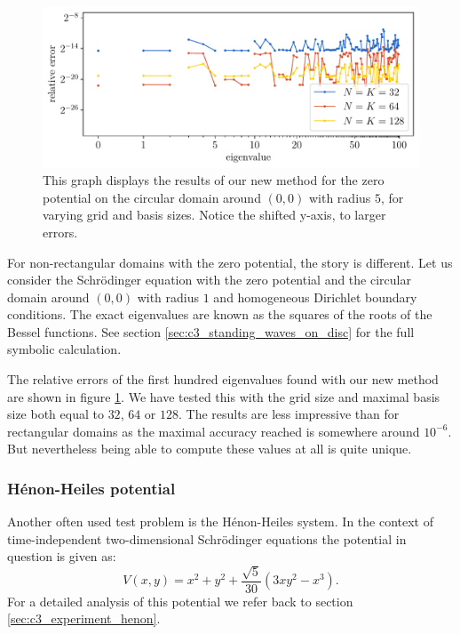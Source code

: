 \begin{figure}
    \begin{center}
        \includegraphics[width=\textwidth]{img/chapter4/nm_test_zero_disc.pdf}
    \end{center}
    \caption{This graph displays the results of our new method for the zero potential on the circular domain around $(0, 0)$ with radius $5$, for varying grid and basis sizes. Notice the shifted y-axis, to larger errors.}
    \label{fig:c4_nm_zero_test_disc}
\end{figure}

For non-rectangular domains with the zero potential, the story is different. Let us consider the Schrödinger equation with the zero potential and the circular domain around $(0, 0)$ with radius $1$ and homogeneous Dirichlet boundary conditions. The exact eigenvalues are known as the squares of the roots of the Bessel functions. See section \ref{sec:c3_standing_waves_on_disc} for the full symbolic calculation.

The relative errors of the first hundred eigenvalues found with our new method are shown in figure \ref{fig:c4_nm_zero_test_disc}. We have tested this with the grid size and maximal basis size both equal to $32$, $64$ or $128$. The results are less impressive than for rectangular domains as the maximal accuracy reached is somewhere around $10^{-6}$. But nevertheless being able to compute these values at all is quite unique.


\subsubsection{Hénon-Heiles potential}\label{sec:c4_numerical_henon_heiles}

Another often used test problem is the Hénon-Heiles system. In the context of time-independent two-dimensional Schrödinger equations the potential in question is given as:
\begin{equation}\label{equ:c4_henon_heiles_potential}
    V(x, y) = x^2 + y^2 + \frac{\sqrt{5}}{30}(3 x y^2 - x^3)\text{.}
\end{equation}
For a detailed analysis of this potential we refer back to section \ref{sec:c3_experiment_henon}.


